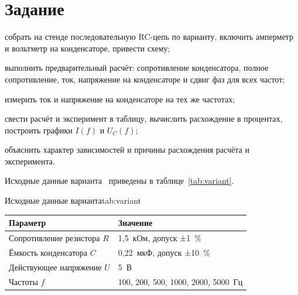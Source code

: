 \section{Задание}
\begin{bbttask}
  \item собрать на стенде последовательную RC-цепь по варианту, включить амперметр и
  вольтметр на конденсаторе, привести схему;\label{task:scheme}
  \item выполнить предварительный расчёт: сопротивление конденсатора, полное сопротивление,
  ток, напряжение на конденсаторе и сдвиг фаз для всех частот;\label{task:calc}
  \item измерить ток и напряжение на конденсаторе на тех же частотах;\label{task:measure}
  \item свести расчёт и эксперимент в таблицу, вычислить расхождение в процентах, построить
  графики $I(f)$ и $U_C(f)$;\label{task:compare}
  \item объяснить характер зависимостей и причины расхождения расчёта и
  эксперимента.\label{task:explain}
\end{bbttask}

Исходные данные варианта~\bbtVariant{} приведены в таблице~\ref{tab:variant}.

\begin{bbttable}{Исходные данные варианта}{tab:variant}
  \begin{tabular}{|l|l|}
    \hline
    Параметр & Значение \\ \hline
    Сопротивление резистора $R$ & 1,5~кОм, допуск ±1~\% \\ \hline
    Ёмкость конденсатора $C$ & 0,22~мкФ, допуск ±10~\% \\ \hline
    Действующее напряжение $U$ & 5~В \\ \hline
    Частоты $f$ & 100, 200, 500, 1000, 2000, 5000~Гц \\ \hline
  \end{tabular}
\end{bbttable}
